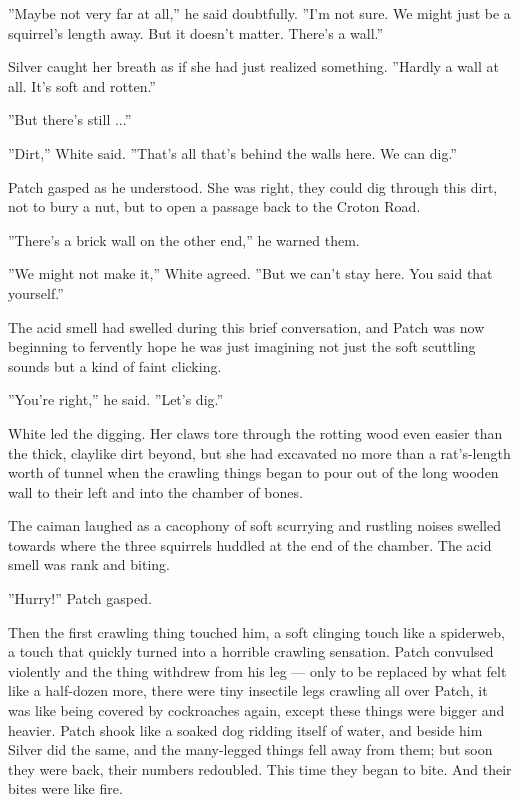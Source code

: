 \documentclass[12pt]{book}
\begin{document}
''Maybe not very far at all,'' he said doubtfully. ''I'm not sure. We might just be a squirrel's length away. But it doesn't matter. There's a wall.''

Silver caught her breath as if she had just realized something. ''Hardly a wall at all. It's soft and rotten.''

''But there's still ...''

''Dirt,'' White said. ''That's all that's behind the walls here. We can dig.''

Patch gasped as he understood. She was right, they could dig through this dirt, not to bury a nut, but to open a passage back to the Croton Road.

''There's a brick wall on the other end,'' he warned them.

''We might not make it,'' White agreed. ''But we can't stay here. You said that yourself.''

The acid smell had swelled during this brief conversation, and Patch was now beginning to fervently hope he was just imagining not just the soft scuttling sounds but a kind of faint clicking.

''You're right,'' he said. ''Let's dig.''

White led the digging. Her claws tore through the rotting wood even easier than the thick, claylike dirt beyond, but she had excavated no more than a rat's-length worth of tunnel when the crawling things began to pour out of the long wooden wall to their left and into the chamber of bones.

The caiman laughed as a cacophony of soft scurrying and rustling noises swelled towards where the three squirrels huddled at the end of the chamber. The acid smell was rank and biting.

''Hurry!'' Patch gasped.

Then the first crawling thing touched him, a soft clinging touch like a spiderweb, a touch that quickly turned into a horrible crawling sensation. Patch convulsed violently and the thing withdrew from his leg ---
only to be replaced by what felt like a half-dozen more, there were tiny insectile legs crawling all over Patch, it was like being covered by cockroaches again, except these things were bigger and heavier. Patch shook like a soaked dog ridding itself of water, and beside him Silver did the same, and the many-legged things fell away from them; but soon they were back, their numbers redoubled. This time they began to bite. And their bites were like fire.
\end{document}
